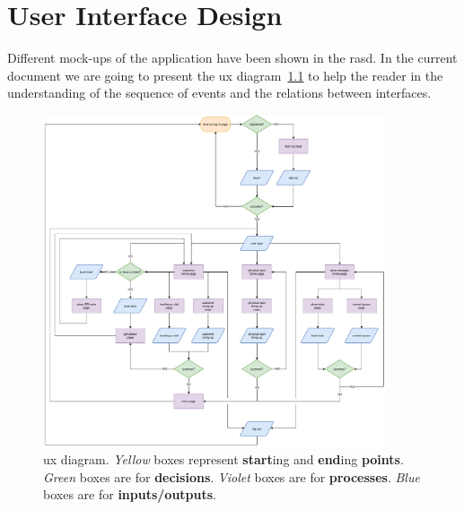 \chapter{User Interface Design}

Different mock-ups of the application have been shown in the \gls{rasd}.
In the current document we are going to present the \gls{ux} diagram~\ref{fig:UXDiagram} to help the reader in the understanding of the sequence of events and the relations between interfaces.

\begin{figure}[H]
	\centering
	\includegraphics[width=0.9\textwidth]{images/UX.pdf}
	\caption{\gls{ux} diagram. \textit{Yellow} boxes represent \textbf{start}ing and \textbf{end}ing \textbf{points}. \textit{Green} boxes are for \textbf{decisions}. \textit{Violet} boxes are for \textbf{processes}. \textit{Blue} boxes are for \textbf{inputs/outputs}.}\label{fig:UXDiagram}
\end{figure}

